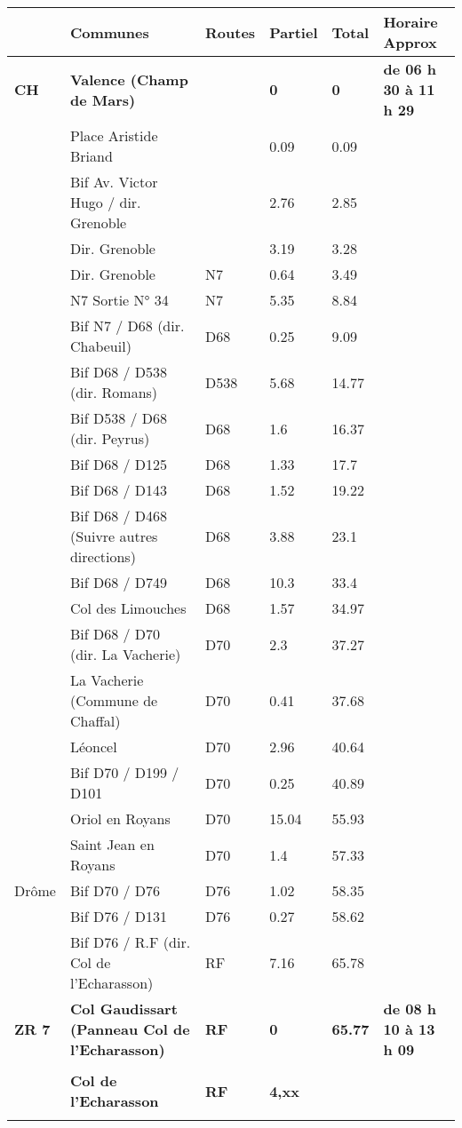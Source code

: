 \documentclass{article}%
\begin{document}
\begin{longtable}{p{2.25cm}|p{7.0cm}|p{1.5cm}|p{1.5cm}|p{1.5cm}|p{3.5cm}}%
\hline%
&Communes&Routes&Partiel&Total&Horaire Approx\\%
\hline%
\endhead%
\endfoot%
\endlastfoot%
\textbf{﻿CH}&\textbf{Valence (Champ de Mars)}& &\textbf{0}&\textbf{0}&\textbf{de 06 h 30 à 11 h 29}\\%
 &Place Aristide Briand & &0.09&0.09& \\%
 &Bif Av. Victor Hugo / dir. Grenoble& &2.76&2.85& \\%
 &Dir. Grenoble& &3.19&3.28& \\%
 &Dir. Grenoble&N7&0.64&3.49& \\%
 &N7  Sortie N° 34&N7&5.35&8.84& \\%
 &Bif N7 / D68 (dir. Chabeuil)&D68&0.25&9.09& \\%
 &Bif D68 / D538 (dir. Romans)&D538&5.68&14.77& \\%
 &Bif D538 / D68 (dir. Peyrus)&D68&1.6&16.37& \\%
 &Bif D68 / D125&D68&1.33&17.7& \\%
 &Bif D68 / D143&D68&1.52&19.22& \\%
 &Bif D68 / D468 (Suivre autres directions)&D68&3.88&23.1& \\%
 &Bif D68 / D749&D68&10.3&33.4& \\%
 &Col des Limouches&D68&1.57&34.97& \\%
 &Bif D68 / D70 (dir. La Vacherie)&D70 &2.3&37.27& \\%
 &La Vacherie (Commune de Chaffal)&D70&0.41&37.68& \\%
 &Léoncel &D70 &2.96&40.64& \\%
 &Bif D70 / D199 / D101&D70&0.25&40.89& \\%
 &Oriol en Royans&D70 &15.04&55.93& \\%
 &Saint Jean en Royans  &D70&1.4&57.33& \\%
Drôme&Bif D70 / D76&D76&1.02&58.35& \\%
 &Bif D76 / D131&D76&0.27&58.62& \\%
 &Bif D76 / R.F (dir. Col de l'Echarasson)&RF&7.16&65.78& \\%
\textbf{ ZR 7    }&\textbf{Col Gaudissart (Panneau Col de l'Echarasson)}&\textbf{RF}&\textbf{0}&\textbf{65.77}&\textbf{de 08 h 10 à 13 h 09}\\%
 & & & & & \\%
 &\textbf{Col de l’Echarasson}&\textbf{RF}&\textbf{4,xx}& & \\%
 & & & & & \\%

\end{longtable}
\end{document}
